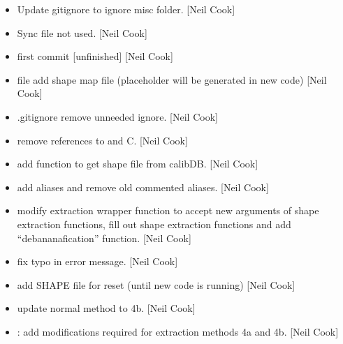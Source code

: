\documentclass[a4paper,10pt,english]{report}
\begin{document}
\begin{itemize}
\item {} 
Update gitignore to ignore misc folder. {[}Neil Cook{]}

\item {} 
Sync file \sphinxhyphen{} not used. {[}Neil Cook{]}

\item {} 
 \sphinxhyphen{} first commit {[}unfinished{]} {[}Neil Cook{]}

\item {} 
 file \sphinxhyphen{} add shape map file (placeholder \sphinxhyphen{} will be
generated in new  code) {[}Neil Cook{]}

\item {} 
.gitignore \sphinxhyphen{} remove unneeded ignore. {[}Neil Cook{]}

\item {} 
 \sphinxhyphen{} remove references to 
and C. {[}Neil Cook{]}

\item {} 
 \sphinxhyphen{} add  function to get shape file from
calibDB. {[}Neil Cook{]}

\item {} 
 \sphinxhyphen{} add aliases and remove old commented
aliases. {[}Neil Cook{]}

\item {} 
 \sphinxhyphen{} modify extraction wrapper function to accept new
arguments of shape extraction functions, fill out shape extraction
functions and add “debananafication” function. {[}Neil Cook{]}

\item {} 
 \sphinxhyphen{} fix typo in error message. {[}Neil Cook{]}

\item {} 
 \sphinxhyphen{} add SHAPE file for reset (until new 
code is running) {[}Neil Cook{]}

\item {} 
 \sphinxhyphen{} update normal method to 4b. {[}Neil Cook{]}

\item {} 
: add modifications required for extraction
methods 4a and 4b. {[}Neil Cook{]}


\end{itemize}
\end{document}
